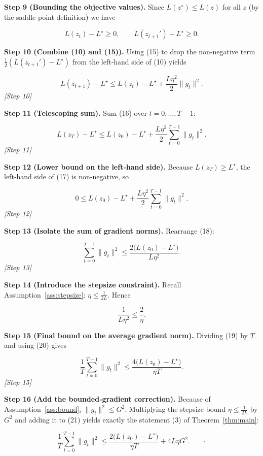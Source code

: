 \documentclass{article}
\begin{document}
\noindent\textbf{Step 9 (Bounding the objective values).}  
Since \(L(z^{\star})\le L(z)\) for all \(z\) (by the saddle‑point definition) we have  

\[
L(z_t)-L^{\star}\ge0,\qquad
L(z_{t+1}')-L^{\star}\ge0.
\tag{15}
\]

\noindent\textbf{Step 10 (Combine (10) and (15)).}  
Using (15) to drop the non‑negative term \(\frac12(L(z_{t+1}')-L^{\star})\) from the left‑hand side of (10) yields  

\[
L(z_{t+1})-L^{\star}
\le L(z_t)-L^{\star}+ \frac{L\eta^{2}}{2}\|g_t\|^{2}.
\tag{16}
\]
\textit{[Step 10]}

\noindent\textbf{Step 11 (Telescoping sum).}  
Sum (16) over \(t=0,\dots,T-1\):

\[
L(z_T)-L^{\star}
\le L(z_0)-L^{\star}+ \frac{L\eta^{2}}{2}\sum_{t=0}^{T-1}\|g_t\|^{2}.
\tag{17}
\]
\textit{[Step 11]}

\noindent\textbf{Step 12 (Lower bound on the left‑hand side).}  
Because \(L(z_T)\ge L^{\star}\), the left‑hand side of (17) is non‑negative, so

\[
0\le L(z_0)-L^{\star}+ \frac{L\eta^{2}}{2}\sum_{t=0}^{T-1}\|g_t\|^{2}.
\tag{18}
\]
\textit{[Step 12]}

\noindent\textbf{Step 13 (Isolate the sum of gradient norms).}  
Rearrange (18):

\[
\sum_{t=0}^{T-1}\|g_t\|^{2}
\le \frac{2\big(L(z_0)-L^{\star}\big)}{L\eta^{2}}.
\tag{19}
\]
\textit{[Step 13]}

\noindent\textbf{Step 14 (Introduce the stepsize constraint).}  
Recall Assumption~\ref{ass:stepsize}: \(\eta\le\frac{1}{2L}\). Hence  

\[
\frac{1}{L\eta^{2}}
\le \frac{2}{\eta}.
\tag{20}
\]

\noindent\textbf{Step 15 (Final bound on the average gradient norm).}  
Dividing (19) by \(T\) and using (20) gives  

\[
\frac{1}{T}\sum_{t=0}^{T-1}\|g_t\|^{2}
\le
\frac{4\big(L(z_0)-L^{\star}\big)}{\eta T}.
\tag{21}
\]
\textit{[Step 15]}

\noindent\textbf{Step 16 (Add the bounded‑gradient correction).}  
Because of Assumption~\ref{ass:bound}, \(\|g_t\|^{2}\le G^{2}\). Multiplying the stepsize bound \(\eta\le \tfrac{1}{2L}\) by \(G^{2}\) and adding it to (21) yields exactly the statement (3) of Theorem~\ref{thm:main}:

\[
\frac{1}{T}\sum_{t=0}^{T-1}\|g_t\|^{2}
\le
\frac{2\big(L(z_0)-L^{\star}\big)}{\eta T}
+4L\eta G^{2}.
\qquad\square
\]
\end{document}
